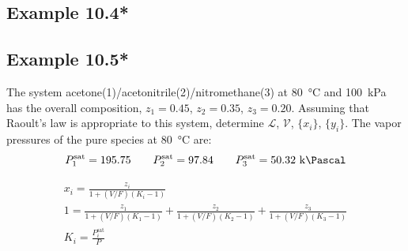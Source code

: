 \documentclass[../main.tex]{subfiles}
\begin{document}
%
\subsection*{Example 10.4*}

%
\subsection*{Example 10.5*}
%
The system acetone(1)/acetonitrile(2)/nitromethane(3) at
80~\unit{\degreeCelsius} and 100~\unit{\kilo\pascal} has the overall
composition, $z_{1}=0.45$, $z_{2}=0.35$, $z_{3}=0.20$. Assuming that
Raoult's law is appropriate to this system, determine $\mathcal{L}$,
$\mathcal{V}$, $\{x_{i}\}$, $\{y_{i}\}$. The vapor pressures of the
pure species at 80~\unit{\degreeCelsius} are:
%
\begin{gather*}%
  P_1^{\text{sat}} = 195.75 \qquad P_2^{\text{sat}} = 97.84 \qquad
  P_3^{\text{sat}} = 50.32~\unit{\kilo\Pascal}
\end{gather*}
%
%
\begin{solution}%
  \begin{gather*}%
    x_{i} = \frac{z_{i}}{1 + (V/F)(K_{i}-1)}\\
    1 = \frac{z_{1}}{1 + (V/F)(K_{1}-1)} + \frac{z_{2}}{1 +
    (V/F)(K_{2}-1)} + \frac{z_{3}}{1 + (V/F)(K_{3} - 1 )}\\
    K_{i} = \frac{P_{i}^{\text{sat}}}{P}\\
  \end{gather*}
\end{solution}
%
\end{document}
